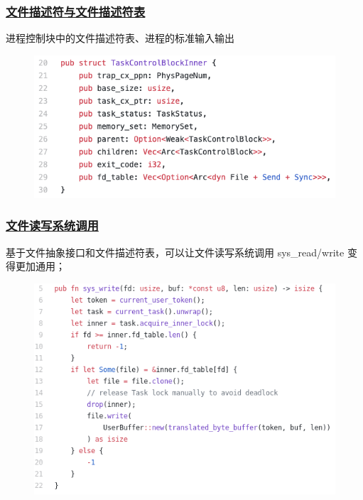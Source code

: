 \begin{frame}
	\frametitle{\href{https://rcore-os.github.io/rCore-Tutorial-Book-v3/chapter6/1file-descriptor.html\#id5}{文件描述符与文件描述符表}}
% 
进程控制块中的文件描述符表、进程的标准输入输出
    \begin{figure}
        \centering
        \includegraphics[width=0.6\linewidth]{figs/task-L20.png}
    \end{figure}
% 
% 
% 
\end{frame}
\begin{frame}
	\frametitle{\href{https://rcore-os.github.io/rCore-Tutorial-Book-v3/chapter6/1file-descriptor.html\#id6}{文件读写系统调用}}
% 
基于文件抽象接口和文件描述符表，可以让文件读写系统调用 sys\_read/write 变得更加通用；
    \begin{figure}
        \centering
        \includegraphics[width=0.6\linewidth]{figs/fs-L5.png}
    \end{figure}
% 

% 
\end{frame}


